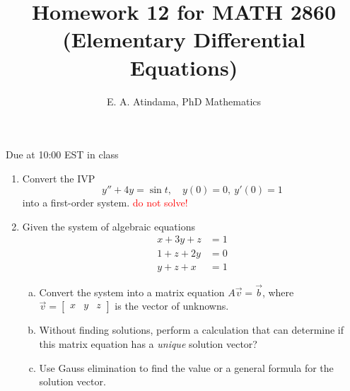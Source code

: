 \documentclass[a4paper,11pt,reqno]{amsart}
\title[MATH 2860 (Elementary Differential Equations)]{Homework 12 for MATH 2860 (Elementary Differential Equations)}
\author[Emmanuel Atindama]{E. A. Atindama, PhD Mathematics}
\numberwithin{equation}{section}
\begin{document}
\maketitle

Due at 10:00 EST in class

\begin{enumerate}[1.]
  \item Convert the IVP
        \[
        y'' + 4y = \sin t, \quad y(0)=0, \ y'(0)=1
        \]
        into a first-order system. \textcolor{red}{do not solve!}
      \begin{center}\setlength{\fboxsep}{10pt}
      \end{center}

  
  \item Given the system of algebraic equations 
      \[
      \begin{aligned}
        x + 3y +z  &= 1 \\
        1 + z + 2y &= 0 \\
        y+z+x &= 1
      \end{aligned}
      \]
      \begin{enumerate}[(a)]
      \item Convert the system into a matrix equation \(A \vec{v} = \vec{b}\), where \(\vec{v} =\begin{bmatrix} x & y & z \end{bmatrix}\) is the vector of unknowns.
      \item Without finding solutions, perform a calculation that can determine if this matrix equation has a \emph{unique} solution vector?
      \item Use Gauss elimination to find the value or a general formula for the solution vector.
      \end{enumerate}
      \begin{center}\setlength{\fboxsep}{10pt}
      \end{center}



\end{enumerate}
\end{document}
